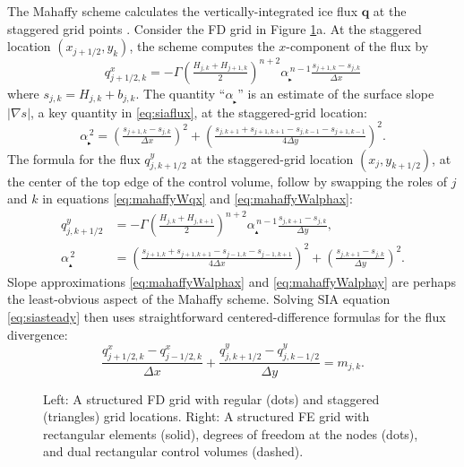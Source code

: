 \documentclass[11pt]{amsart}
\newcommand\bq{\mathbf{q}}
\newcommand{\grad}{\nabla}
\newcommand\alpharight{\alpha_{{}_{\blacktriangleright}}}
\newcommand\alphaup{\alpha_{{\!}_{\blacktriangle}}}
\begin{document}
The Mahaffy scheme calculates the vertically-integrated ice flux $\bq$ at the staggered grid points \cite[equations (19), (20)]{Mahaffy1976}.  Consider the FD grid in Figure \ref{fig:fdfemgrids}a.  At the staggered location $(x_{j+1/2},y_k)$, the scheme computes the $x$-component of the flux by
\begin{equation}
q^x_{j+1/2,k} = - \Gamma \left(\tfrac{H_{j,k} + H_{j+1,k}}{2}\right)^{n+2} \alpharight^{\,n-1} \tfrac{s_{j+1,k} - s_{j,k}}{\Delta x}  \label{eq:mahaffyWqx}
\end{equation}
where $s_{j,k} = H_{j,k} + b_{j,k}$.  The quantity ``$\alpharight$\!'' is an estimate of the surface slope $|\grad s|$, a key quantity in \eqref{eq:siaflux}, at the staggered-grid location:
\begin{equation}
\alpharight^{\,2} = \left(\tfrac{s_{j+1,k} - s_{j,k}}{\Delta x}\right)^2 + \left(\tfrac{s_{j,k+1} + s_{j+1,k+1} - s_{j,k-1} - s_{j+1,k-1}}{4 \Delta y}\right)^2.  \label{eq:mahaffyWalphax}
\end{equation}
The formula for the flux $q^y_{j,k+1/2}$ at the staggered-grid location $(x_j,y_{k+1/2})$, at the center of the top edge of the control volume, follow by swapping the roles of $j$ and $k$ in equations \eqref{eq:mahaffyWqx} and \eqref{eq:mahaffyWalphax}:
\begin{align}
q^y_{j,k+1/2} &= - \Gamma \left(\tfrac{H_{j,k} + H_{j,k+1}}{2}\right)^{n+2} \alphaup^{\,n-1} \tfrac{s_{j,k+1} - s_{j,k}}{\Delta y}, \label{eq:mahaffyWqy} \\
\alphaup^{\,2} &= \left(\tfrac{s_{j+1,k} + s_{j+1,k+1} - s_{j-1,k} - s_{j-1,k+1}}{4 \Delta x}\right)^2 + \left(\tfrac{s_{j,k+1} - s_{j,k}}{\Delta y}\right)^2.  \label{eq:mahaffyWalphay}
\end{align}
Slope approximations \eqref{eq:mahaffyWalphax} and \eqref{eq:mahaffyWalphay} are perhaps the least-obvious aspect of the Mahaffy scheme.  Solving SIA equation \eqref{eq:siasteady} then uses straightforward centered-difference formulas \cite{MortonMayers2005} for the flux divergence:
\begin{equation}
\frac{q^x_{j+1/2,k} - q^x_{j-1/2,k}}{\Delta x} + \frac{q^y_{j,k+1/2}- q^y_{j,k-1/2}}{\Delta y} = m_{j,k}.  \label{eq:siasteadyfd}
\end{equation}

\begin{figure}[ht]
\begin{center}
 \quad 
\end{center}
\caption{Left: A structured FD grid with regular (dots) and staggered (triangles) grid locations.  Right: A structured FE grid with rectangular elements (solid), degrees of freedom at the nodes (dots), and dual rectangular control volumes (dashed).}
\label{fig:fdfemgrids}
\end{figure}
\end{document}
